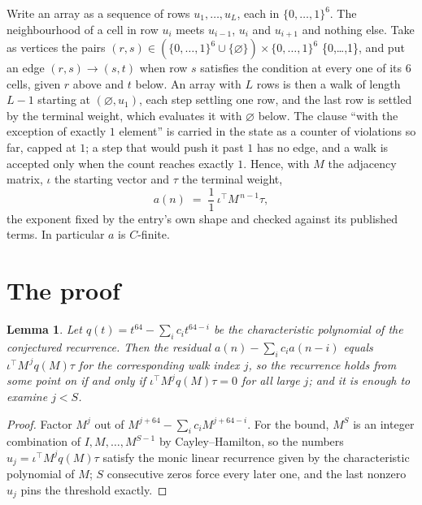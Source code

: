 \documentclass[11pt,a4paper]{article}
\theoremstyle{plain}
\newtheorem{lemma}[theorem]{Lemma}
\theoremstyle{definition}
\begin{document}
Write an array as a sequence of rows $u_1,\dots,u_L$, each in
$\{0,\dots,1\}^{6}$. The neighbourhood of a cell in row $u_i$ meets $u_{i-1}$,
$u_i$ and $u_{i+1}$ and nothing else. Take as vertices the pairs
$(r,s)\in(\{0,\dots,1\}^{6}\cup\{\varnothing\})\times\{0,\dots,1\}^{6}$ \times \{0,\dots,1\},
and put an edge $(r,s)\to(s,t)$ when row $s$ satisfies the condition at every one of its
$6$ cells, given $r$ above and $t$ below. An array with $L$ rows is then a walk of length
$L-1$ starting at $(\varnothing,u_1)$, each step settling one row, and the last row is
settled by the terminal weight, which evaluates it with $\varnothing$ below. The clause ``with the exception of exactly $1$ element'' is carried in
the state as a counter of violations so far, capped at $1$; a step that would push it past
$1$ has no edge, and a walk is accepted only when the count reaches exactly $1$. Hence,
with $M$ the adjacency matrix, $\iota$ the starting vector and $\tau$ the terminal weight,
\[
a(n)\;=\;\frac{1}{1}\,\iota^{\!\top}M^{\,n-1}\tau ,
\]
the exponent fixed by the entry's own shape and checked against its published terms. In
particular $a$ is $C$-finite.

\section{The proof}

\begin{lemma}\label{lem:crit}
Let $q(t)=t^{64}-\sum_i c_it^{64-i}$ be the characteristic polynomial of the
conjectured recurrence. Then the residual $a(n)-\sum_ic_ia(n-i)$ equals
$\iota^{\!\top}M^{\,j}q(M)\tau$ for the corresponding walk index $j$, so the
recurrence holds from some point on if and only if $\iota^{\!\top}M^{j}q(M)\tau=0$ for all
large $j$; and it is enough to examine $j<S$.
\end{lemma}

\begin{proof}
Factor $M^{j}$ out of $M^{j+64}-\sum_ic_iM^{j+64-i}$. For the bound, $M^{S}$
is an integer combination of $I,M,\dots,M^{S-1}$ by Cayley--Hamilton, so the numbers
$u_j=\iota^{\!\top}M^{j}q(M)\tau$ satisfy the monic linear recurrence given by the
characteristic polynomial of $M$; $S$ consecutive zeros force every later one, and the last
nonzero $u_j$ pins the threshold exactly.
\end{proof}
\end{document}
